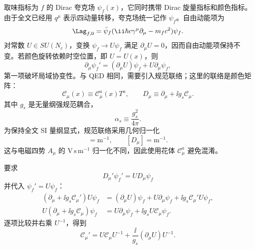 取味指标为 $f$ 的 Dirac 夸克场 \(\psi_f(x)\)，它同时携带 Dirac 旋量指标和颜色指标。由于全文已经用 \(q^\mu\) 表示四动量转移，夸克场统一记作 \(\psi_f\)。自由动能项为
\begin{equation}
 \Lag_{f,0}=\bar\psi_f(\ii\hbar c\gamma^\mu\partial_\mu-m_fc^2)\psi_f.
 \label{eq:free-quark-lagrangian-dp10}
\end{equation}
对常数 \(U\in SU(N_c)\)，变换 \(\psi_f\to U\psi_f\) 满足 \(\partial_\mu U=0\)，因而自由动能项保持不变。若颜色旋转依赖时空位置，即 \(U=U(x)\)，则
\begin{equation*}
 \partial_\mu \psi_f'
 =(\partial_\mu U)\psi_f+U\partial_\mu \psi_f,
\end{equation*}
第一项破坏局域协变性。与 QED 相同，需要引入规范联络；这里的联络是颜色矩阵：
\begin{equation*}
 \mathscr C_\mu(x)
 \equiv\mathscr C_\mu^a(x)T^a,
 \qquad
 D_\mu\equiv\partial_\mu+\ii g_s\mathscr C_\mu.
\end{equation*}
其中 \(g_s\) 是无量纲强规范耦合，
\begin{equation}
 \alpha_s\equiv\frac{g_s^2}{4\pi}.
 \label{eq:alpha-s-definition-dp10}
\end{equation}
为保持全文 SI 量纲显式，规范联络采用几何归一化
\begin{equation*}
 [\mathscr C_\mu]=\mathrm{m^{-1}},
 \qquad [D_\mu]=\mathrm{m^{-1}}.
\end{equation*}
这与电磁四势 \(A_\mu\) 的 \(\mathrm{V\,s\,m^{-1}}\) 归一化不同，因此使用花体 \(\mathscr C_\mu^a\) 避免混淆。

要求
\begin{equation}
 D_\mu'\psi_f'=U D_\mu\psi_f
 \label{eq:qcd-covariance-requirement-dp10}
\end{equation}
并代入 \(\psi_f'=U\psi_f\)：
\begin{align*}
 (\partial_\mu+\ii g_s\mathscr C_\mu')U\psi_f
 &=(\partial_\mu U)\psi_f+U\partial_\mu\psi_f
 +\ii g_s\mathscr C_\mu'U\psi_f,\\
 U(\partial_\mu+\ii g_s\mathscr C_\mu)\psi_f
 &=U\partial_\mu\psi_f+\ii g_sU\mathscr C_\mu\psi_f.
\end{align*}
逐项比较并右乘 \(U^{-1}\)，得到
\begin{equation}
 \boxed{
 \mathscr C_\mu'
 =U\mathscr C_\mu U^{-1}
 +\frac{\ii}{g_s}(\partial_\mu U)U^{-1}.}
 \label{eq:qcd-gauge-field-transformation-dp10}
\end{equation}

